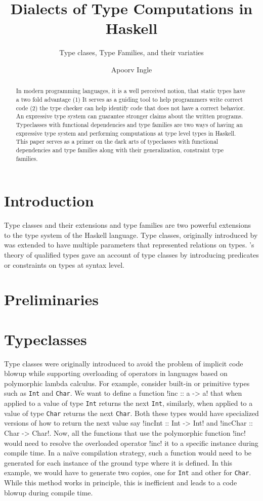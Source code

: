 \documentclass[format=sigplan,manuscript,review,screen, nonacm]{acmart}
\title{Dialects of Type Computations in Haskell}
\subtitle{Type clases, Type Families, and their variaties}
\author{Apoorv Ingle}
\affiliation{%
  \institution{University of Iowa}
  \department{Department of Computer Science}
  \streetaddress{McLean Hall}
  \city{Iowa City}
  \state{Iowa}
  \country{USA}}
\begin{document}
\begin{abstract}
In modern programming languages, it is a well perceived notion,
that static types have a two fold advantage (1) It serves as a guiding tool to help programmers
write correct code (2) the type checker can help identify
code that does not have a correct behavior. An expressive type system can
guarantee stronger claims about the written programs. Typeclasses
with functional dependencies and type families are two ways of having an expressive
type system and performing computations at type level types in Haskell.
This paper serves as a primer on the dark arts of typeclasses with functional dependencies
and type families along with their generalization, constraint type families.
\end{abstract}
\maketitle

\section{Introduction}
Type classes and their extensions and type families are two powerful extensions to
the type system of the Haskell language. Type classes, originally introduced by
\cite{wadler_polymorphism_1989} was extended to have multiple parameters
that represented relations on types. \citep{jones_qualified_1994}'s
theory of qualified types gave an account of type classes by introducing predicates or
constraints on types at syntax level.

\section {Preliminaries}

\section{Typeclasses}
Type classes were originally introduced to avoid the problem of implicit code blowup while supporting
overloading of operators in languages based on polymorphic lambda calculus.
For example, consider built-in or primitive types such as \texttt{Int} and \texttt{Char}.
We want to define a function !inc :: a -> a! that when applied to a value of type
\texttt{Int} returns the next \texttt{Int}, similarly, when applied to a value of type \texttt{Char}
returns the next \texttt{Char}. Both these types would have specialized versions of how
to return the next value say !incInt :: Int -> Int! and !incChar :: Char -> Char!.
Now, all the functions that use the polymorphic function !inc! would need to resolve
the overloaded operator !inc! it to a specific instance during compile time. In a na\"ive compilation strategy,
such a function would need to be generated for each instance of the ground type where it is defined.
In this example, we would have to generate two copies, one for \texttt{Int} and other for \texttt{Char}.
While this method works in principle, this is inefficient and leads to a code blowup during compile time.
\end{document}

